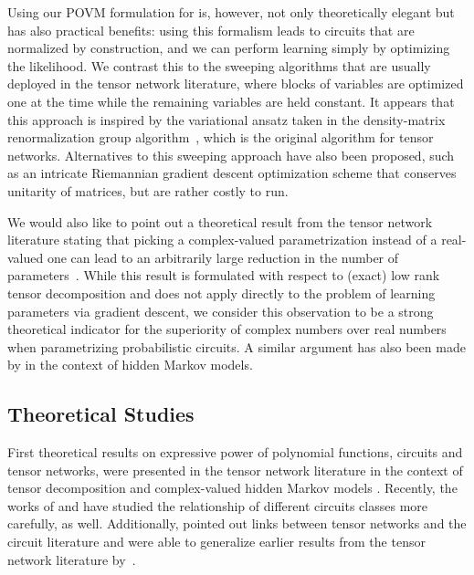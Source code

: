 Using our POVM formulation for \puncs is, however, not only theoretically elegant but has also practical benefits: using this formalism leads to circuits that are normalized by construction, and we can perform learning simply by optimizing the likelihood. We contrast this to the sweeping algorithms that are usually deployed in the tensor network literature, where blocks of variables are optimized one at the time while the remaining variables are held constant. It appears that this approach is inspired by the variational ansatz taken in the density-matrix renormalization group algorithm~\citep{white1992density}, which is the original algorithm for tensor networks.
Alternatives to this sweeping approach have also been proposed, such as an intricate Riemannian gradient descent optimization scheme that conserves unitarity of matrices, but are rather costly to run.

We would also like to point out a theoretical result from the tensor network literature stating that picking a complex-valued parametrization instead of a real-valued one can lead to an arbitrarily large reduction in the number of parameters~\citep{glasser2019expressive}. While this result is formulated with respect to (exact) low rank tensor decomposition and does not apply directly to the problem of learning parameters via gradient descent, we consider this observation to be a strong theoretical indicator for the superiority of complex numbers over real numbers when parametrizing probabilistic circuits. A similar argument has also been made by \citet{gao2022enhancing} in the context of hidden Markov models.

\subsection{Theoretical Studies}

First theoretical results on expressive power of polynomial functions, \ie circuits and tensor networks, were presented in the tensor network literature in the context of tensor decomposition \citep{glasser2019expressive} and complex-valued hidden Markov models \citep{gao2022enhancing}. Recently, the works of \citet{loconte2024subtractive,loconte2024sum} and \citet{wangrelationship} have studied the relationship of different circuits classes more carefully, as well. Additionally, \citet{loconte2024sum} pointed out links between tensor networks and the circuit literature and were able to generalize earlier results from the tensor network literature by~\citet{glasser2019expressive}.

